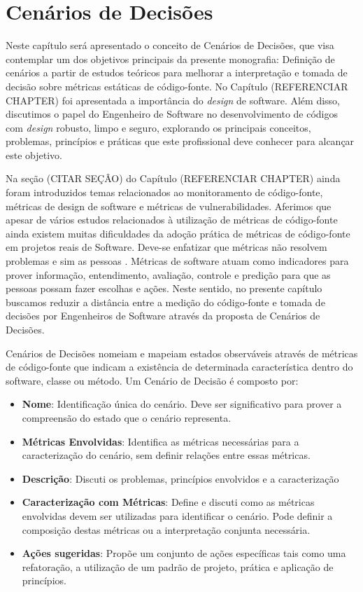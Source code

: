 \chapter{Cenários de Decisões}
\label{cap-scenery}

Neste capítulo será apresentado o conceito de Cenários de Decisões, que visa contemplar um dos objetivos principais da presente monografia: Definição de cenários a partir de estudos teóricos para melhorar a interpretação e tomada de decisão sobre métricas estáticas de código-fonte. No Capítulo (REFERENCIAR CHAPTER) foi apresentada a importância do \emph{design} de software. Além disso, discutimos o papel do Engenheiro de Software no desenvolvimento de códigos com \emph{design} robusto, limpo e seguro, explorando os principais conceitos, problemas, princípios e práticas que este profissional deve conhecer para alcançar este objetivo. 

%

Na seção (CITAR SEÇÂO) do Capítulo (REFERENCIAR CHAPTER) ainda foram introduzidos temas relacionados ao monitoramento de código-fonte, métricas de design de software e métricas de vulnerabilidades. Aferimos que apesar de vários estudos relacionados à utilização de métricas de código-fonte ainda existem muitas dificuldades da adoção prática de métricas de código-fonte em projetos reais de Software. Deve-se enfatizar que métricas não resolvem problemas e sim as pessoas \cite{westfall2005}. Métricas de software atuam como indicadores para prover informação, entendimento, avaliação, controle e predição para que as pessoas possam fazer escolhas e ações. Neste sentido, no presente capítulo buscamos reduzir a distância entre a medição do código-fonte e tomada de decisões por Engenheiros de Software através da proposta de Cenários de Decisões.

%

Cenários de Decisões nomeiam e mapeiam estados observáveis através de métricas de código-fonte que indicam a existência de determinada característica dentro do software, classe ou método. Um Cenário de Decisão é composto por:

%

\begin{itemize}
\item \textbf{Nome}: Identificação única do cenário. Deve ser significativo para prover a compreensão do estado que o cenário representa.
\item \textbf{Métricas Envolvidas}: Identifica as métricas necessárias para a caracterização do cenário, sem definir relações entre essas métricas.
\item \textbf{Descrição}: Discuti os problemas, princípios envolvidos e a caracterização
\item \textbf{Caracterização com Métricas}: Define e discuti como as métricas envolvidas devem ser utilizadas para identificar o cenário. Pode definir a composição destas métricas ou a interpretação conjunta necessária.
\item \textbf{Ações sugeridas}: Propõe um conjunto de ações específicas tais como uma refatoração, a utilização de um padrão de projeto, prática e aplicação de princípios.
\end{itemize}


